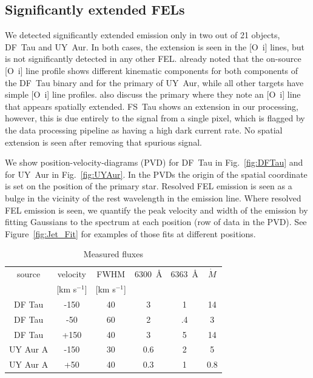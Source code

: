 \documentclass[twocolumn,trackchanges]{aastex63}
\begin{document}
\subsection{Significantly extended FELs}
We detected significantly extended emission only in two out of 21 objects,
DF~Tau and UY~Aur. In both cases, the extension is seen in the [O~{\sc i}]
lines, but is not significantly detected in any other
FEL. \citet{2003ApJ...583..334H} already noted that the on-source [O~{\sc i}]
line profile shows different kinematic components for both components of the
DF~Tau binary and for the primary of UY~Aur, while all other targets have
simple [O~{\sc i}] line profiles. \citet{2003ApJ...583..334H} also discuss the
 primary where they note an [O~{\sc i}] line that appears spatially
extended. FS~Tau shows an extension in our processing, however, this is due
entirely to the signal from a single pixel, which is flagged by the data
processing pipeline as having a high dark current rate. No spatial extension is seen after removing that spurious signal.

We show position-velocity-diagrams (PVD) for DF~Tau in Fig.~\ref{fig:DFTau}
and for UY~Aur in Fig.~\ref{fig:UYAur}. In the PVDs the
origin of the spatial coordinate is set on the position of the primary star. Resolved
FEL emission is seen as a bulge in the vicinity of the rest wavelength
in the emission line. Where resolved FEL emission is seen, we quantify the peak
velocity and width of the emission by fitting Gaussians to the spectrum at each
position (row of data in the PVD). See Figure~\ref{fig:Jet_Fit} for examples of
those fits at different positions.

\begin{table}
\caption{Measured fluxes\label{tab:flux}}
\begin{center}
\begin{tabular}{cccccc}
\hline\hline
source & velocity & FWHM & 6300~\AA{} & 6363~\AA{} & $\dot M$\\ 
       & [km s$^{-1}$] & [km s$^{-1}$] & \tablenotemark{a} & \tablenotemark{a} & \tablenotemark{b}\\
\hline
DF Tau & -150 & 40 & 3 & 1 &  14\\
DF Tau & -50 & 60 & 2 & .4 & 3\\
DF Tau & +150 & 40 & 3 & 5 & 14\\
UY Aur A & -150 & 30 & 0.6 & 2 & 5\\
UY Aur A & +50 & 40 & 0.3 & 1 & 0.8\\
\end{tabular}
\end{center}
\end{table}
\end{document}
